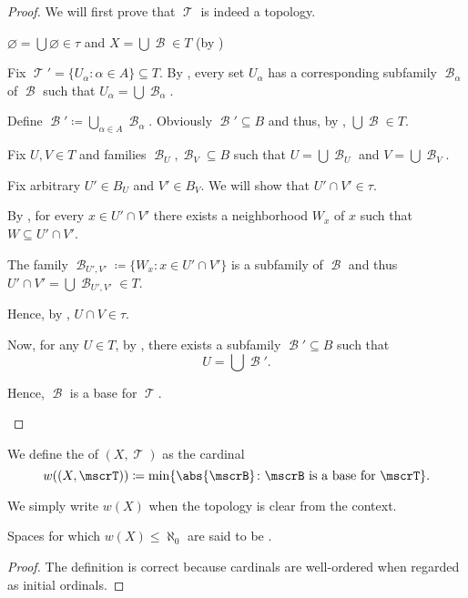\begin{proof}
  We will first prove that \( \mscrT \) is indeed a topology.

  \begin{refenum}
     \( \varnothing = \bigcup \varnothing \in \tau \) and \( X = \bigcup \mscrB \in T \) (by )

     Fix \( \mscrT' = \{ U_\alpha \colon \alpha \in A \} \subseteq T \). By , every set \( U_\alpha \) has a corresponding subfamily \( \mscrB_\alpha \) of \( \mscrB \) such that \( U_\alpha = \bigcup \mscrB_\alpha \).

    Define \( \mscrB' \coloneqq \bigcup_{\alpha \in A} \mscrB_\alpha \). Obviously \( \mscrB' \subseteq B \) and thus, by , \( \bigcup \mscrB \in T \).

     Fix \( U, V \in T \) and families \( \mscrB_U, \mscrB_V \subseteq B \) such that \( U = \bigcup \mscrB_U \) and \( V = \bigcup \mscrB_V \).

    Fix arbitrary \( U' \in B_U \) and \( V' \in B_V \). We will show that \( U' \cap V' \in \tau \).

    By , for every \( x \in U' \cap V' \) there exists a neighborhood \( W_x \) of \( x \) such that \( W \subseteq U' \cap V' \).

    The family \( \mscrB_{U',V'} \coloneqq \{ W_x \colon x \in U' \cap V' \} \) is a subfamily of \( \mscrB \) and thus \( U' \cap V' = \bigcup \mscrB_{U',V'} \in T \).

    Hence, by , \( U \cap V \in \tau \).

    Now, for any \( U \in T \), by , there exists a subfamily \( \mscrB' \subseteq B \) such that
    \begin{equation*}
      U = \bigcup \mscrB'.
    \end{equation*}

    Hence, \( \mscrB \) is a base for \( \mscrT \).
  \end{refenum}
\end{proof}

\begin{definition}\label{def:topological_space_weight}
  We define the  of \( (X, \mscrT) \) as the cardinal
  \begin{equation*}
    w((X, \mscrT)) \coloneqq \min \{ \abs{\mscrB} \colon \mscrB \text{ is a base for } \mscrT \}.
  \end{equation*}

  We simply write \( w(X) \) when the topology is clear from the context.

  Spaces for which \( w(X) \leq \aleph_0 \) are said to be .
\end{definition}
\begin{proof}
  The definition is correct because cardinals are well-ordered when regarded as initial ordinals.
\end{proof}

